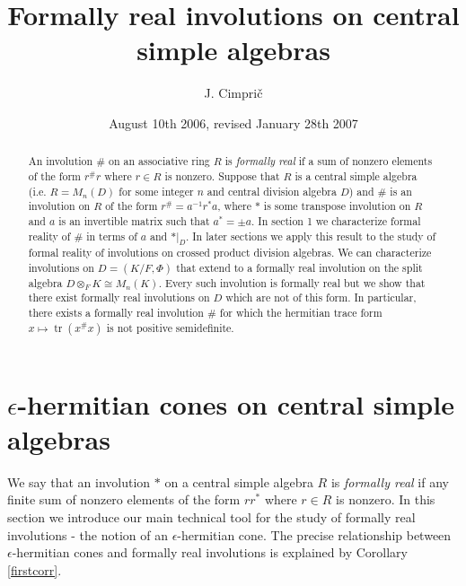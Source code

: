 \documentclass[12pt,reqno]{amsart}
\theoremstyle{definition}
\providecommand{\eps}{\epsilon}
\DeclareMathOperator{\tr}{tr}
\begin{document}
\title{Formally real involutions on central simple algebras}{}

\author{J. Cimpri\v c}



\date{August 10th 2006, revised January 28th 2007}

\address{Jaka Cimpri\v c, University of Ljubljana, Faculty of Math. and Phys.,
Dept. of Math., Jadranska 19, SI-1000 Ljubljana, Slovenija. 
E-mail: cimpric@fmf.uni-lj.si. www page: http://www.fmf.uni-lj.si/ $\!\!\sim$cimpric.}

\begin{abstract}
An involution $\#$ on an associative ring $R$ is \textit{formally real} if 
a sum of nonzero elements of the form $r^\# r$ where $r \in R$ is nonzero.
Suppose that $R$ is a central simple algebra (i.e. $R=M_n(D)$ for some integer $n$
and central division algebra $D$) and $\#$ is an involution on $R$ of the form 
$r^\# = a^{-1} r^\ast a$, where $\ast$ is some transpose involution on $R$ 
and $a$ is an invertible matrix such that $a^\ast=\pm a$.
In section 1 we characterize formal reality of $\#$ in terms of $a$ and $\ast|_D$.
In later sections we apply this result to the study of formal reality
of involutions on crossed product division algebras. We can characterize
involutions on $D=(K/F,\Phi)$ that extend to a formally real involution 
on the split algebra $D \otimes_F K \cong M_n(K)$. Every such involution 
is formally real but we show that there exist formally real involutions 
on $D$ which are not of this form. In particular, there exists
a formally real involution $\#$ for which the hermitian trace form
$x \mapsto \tr(x^\#x)$ is not positive semidefinite.
\end{abstract}


\maketitle

\thispagestyle{empty}
\section{$\eps$-hermitian cones on central simple algebras}


We say that an involution $\ast$ on a central simple algebra $R$ is \textit{formally real}
if any finite sum of nonzero elements of the form $rr^\ast$ where $r \in R$ is nonzero. 
In this section we introduce our main technical tool for  the study of formally real involutions
- the notion of an $\eps$-hermitian cone. The precise relationship between
$\eps$-hermitian cones and formally real involutions is explained by Corollary \ref{firstcorr}.
\end{document}
